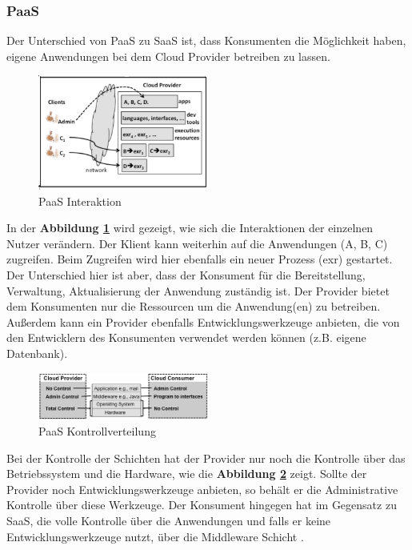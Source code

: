 \subsubsection{PaaS}
Der Unterschied von PaaS zu SaaS ist, dass Konsumenten die Möglichkeit haben, eigene Anwendungen bei dem Cloud Provider betreiben zu lassen.
\begin{figure}[h]
    \centering
	\includegraphics[width=0.5\textwidth]{Images/PaaSInteraction}
	\caption{PaaS Interaktion \cite{Badger}}
	\label{PaaSInteration}
\end{figure}
In der \textbf{Abbildung \ref{PaaSInteration}} wird gezeigt, wie sich die Interaktionen der einzelnen Nutzer verändern.
Der Klient kann weiterhin auf die Anwendungen (A, B, C) zugreifen. Beim Zugreifen wird hier ebenfalls ein neuer Prozess (exr) gestartet. Der Unterschied hier ist aber, dass
der Konsument für die Bereitstellung, Verwaltung, Aktualisierung der Anwendung zuständig ist. Der Provider bietet dem Konsumenten nur die Ressourcen um die Anwendung(en) zu betreiben.
Außerdem kann ein Provider ebenfalls Entwicklungswerkzeuge anbieten, die von den Entwicklern des Konsumenten verwendet werden können (z.B. eigene Datenbank).
\begin{figure}[h]
    \centering
	\includegraphics[width=0.5\textwidth]{Images/PaaSControl}
	\caption{PaaS Kontrollverteilung \cite{Badger}}
	\label{PaaSControl}
\end{figure}
Bei der Kontrolle der Schichten hat der Provider nur noch die Kontrolle über das Betriebssystem und die Hardware, wie die \textbf{Abbildung \ref{PaaSControl}} zeigt.
Sollte der Provider noch Entwicklungswerkzeuge anbieten, so behält er die Administrative Kontrolle über diese Werkzeuge. Der Konsument hingegen hat im Gegensatz zu SaaS,
die volle Kontrolle über die Anwendungen und falls er keine Entwicklungswerkzeuge nutzt, über die Middleware Schicht \cite{Badger}. 

